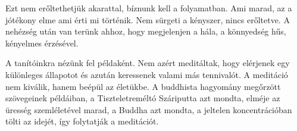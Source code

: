 Ezt nem erőltethetjük akarattal, bíznunk kell a folyamatban. Ami marad,
az a jótékony elme ami érti mi történik. Nem sürgeti a kényszer, nincs
erőltetve. A nehézség után van terünk ahhoz, hogy megjelenjen a hála, a
könnyedség hűs, kényelmes érzésével.

A tanítóinkra nézünk fel példaként. Nem azért meditáltak, hogy elérjenek
egy különleges állapotot és azután keressenek valami más tennivalót. A
meditáció nem kiválik, hanem beépül az életükbe. A buddhista hagyomány
megőrzött szövegeinek példáiban, a Tiszteletreméltó Száriputta azt
mondta, elméje az üresség szemléletével marad, a Buddha azt mondta, a
jeltelen koncentrációban tölti az idejét, így folytatják a meditációt.

